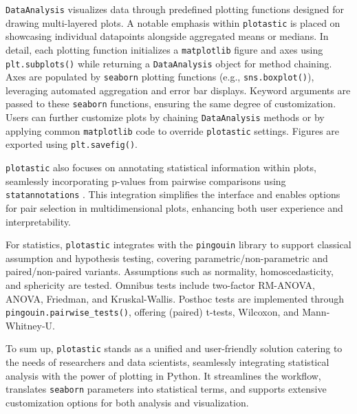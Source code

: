 \texttt{DataAnalysis} visualizes data through predefined plotting functions
designed for drawing multi-layered plots. A notable emphasis within
\texttt{plotastic} is placed on showcasing individual datapoints alongside
aggregated means or medians. In detail, each plotting function
initializes a \texttt{matplotlib} figure and axes using \texttt{plt.subplots()} while
returning a \texttt{DataAnalysis} object for method chaining. Axes are
populated by \texttt{seaborn} plotting functions (e.g., \texttt{sns.boxplot()}),
leveraging automated aggregation and error bar displays. Keyword
arguments are passed to these \texttt{seaborn} functions, ensuring the same
degree of customization. Users can further customize plots
by chaining \texttt{DataAnalysis} methods or by applying common \texttt{matplotlib} code
to override \texttt{plotastic} settings. Figures are exported using
\texttt{plt.savefig()}.

\texttt{plotastic} also focuses on annotating statistical information within
plots, seamlessly incorporating p-values from pairwise comparisons using
\texttt{statannotations} \cite{charlierTrevismdStatannotationsV02022}. This
integration simplifies the interface and enables options for pair
selection in multidimensional plots, enhancing both user experience and
interpretability.

For statistics, \texttt{plotastic} integrates with the \texttt{pingouin} library
to support classical assumption and hypothesis testing, covering
parametric/non-parametric and paired/non-paired variants. Assumptions such as
normality, homoscedasticity, and sphericity are tested. Omnibus tests include
two-factor RM-ANOVA, ANOVA, Friedman, and Kruskal-Wallis. Posthoc tests are
implemented through \texttt{pingouin.pairwise\_tests()}, offering (paired)
t-tests, Wilcoxon, and Mann-Whitney-U.

To sum up, \texttt{plotastic} stands as a unified and user-friendly solution
catering to the needs of researchers and data scientists, seamlessly
integrating statistical analysis with the power of plotting in Python.
It streamlines the workflow, translates \texttt{seaborn} parameters into
statistical terms, and supports extensive customization options for both
analysis and visualization.

\newpage




